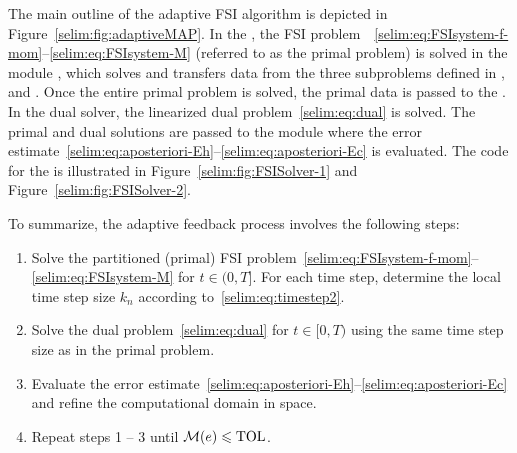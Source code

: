 The main outline of the adaptive FSI algorithm is depicted in
Figure~\ref{selim:fig:adaptiveMAP}. In the , the FSI
problem~~\eqref{selim:eq:FSIsystem-f-mom}--\eqref{selim:eq:FSIsystem-M}
(referred to as the primal problem)
is solved in the module , which solves and
transfers data from the three subproblems defined in
,  and . Once
the entire primal problem is solved, the primal data is passed to the
. In the dual solver, the linearized dual
problem~\eqref{selim:eq:dual} is solved. The primal and dual solutions
are passed to the module  where the error
estimate~\eqref{selim:eq:aposteriori-Eh}--\eqref{selim:eq:aposteriori-Ec} is evaluated. The code for the
 is illustrated in
Figure~\ref{selim:fig:FSISolver-1} and Figure~\ref{selim:fig:FSISolver-2}.

To summarize, the adaptive feedback process involves the following steps:
\begin{enumerate}
  \item Solve the partitioned (primal) FSI
  problem~\eqref{selim:eq:FSIsystem-f-mom}--\eqref{selim:eq:FSIsystem-M}
 for $t\in(0,T]$. For each
  time step, determine the local time step size $k_n$ according
  to~\eqref{selim:eq:timestep2}.

  \item Solve the dual problem~\eqref{selim:eq:dual} for $t\in[0,T)$
  using the same time step size as in the primal problem.

  \item Evaluate the error estimate~\eqref{selim:eq:aposteriori-Eh}--\eqref{selim:eq:aposteriori-Ec} and
  refine the computational domain in space.

  \item Repeat steps 1 -- 3 until $\mathcal{M}(e)\leqslant \mathrm{TOL}$.
\end{enumerate}

